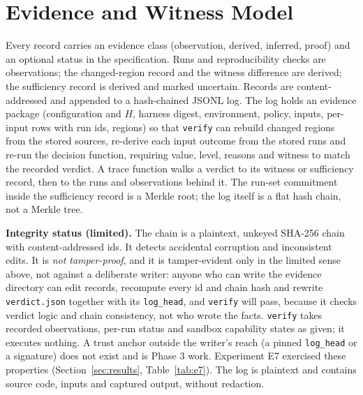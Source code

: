 \section{Evidence and Witness Model}\label{sec:evidence}
Every record carries an evidence class (observation, derived, inferred, proof) and an optional status in the specification. Runs and reproducibility checks are observations; the changed-region record and the witness difference are derived; the sufficiency record is derived and marked uncertain. Records are content-addressed and appended to a hash-chained JSONL log. The log holds an evidence package (configuration and $H$, harness digest, environment, policy, inputs, per-input rows with run ids, regions) so that \texttt{verify} can rebuild changed regions from the stored sources, re-derive each input outcome from the stored runs and re-run the decision function, requiring value, level, reasons and witness to match the recorded verdict. A trace function walks a verdict to its witness or sufficiency record, then to the runs and observations behind it. The run-set commitment inside the sufficiency record is a Merkle root; the log itself is a flat hash chain, not a Merkle tree.

\textbf{Integrity status (limited).} The chain is a plaintext, unkeyed SHA-256 chain with content-addressed ids. It detects accidental corruption and inconsistent edits. It is \emph{not tamper-proof}, and it is tamper-evident only in the limited sense above, not against a deliberate writer: anyone who can write the evidence directory can edit records, recompute every id and chain hash and rewrite \texttt{verdict.json} together with its \texttt{log\_head}, and \texttt{verify} will pass, because it checks verdict logic and chain consistency, not who wrote the facts. \texttt{verify} takes recorded observations, per-run status and sandbox capability states as given; it executes nothing. A trust anchor outside the writer's reach (a pinned \texttt{log\_head} or a signature) does not exist and is Phase 3 work. Experiment E7 exercised these properties (Section~\ref{sec:results}, Table~\ref{tab:e7}). The log is plaintext and contains source code, inputs and captured output, without redaction.
